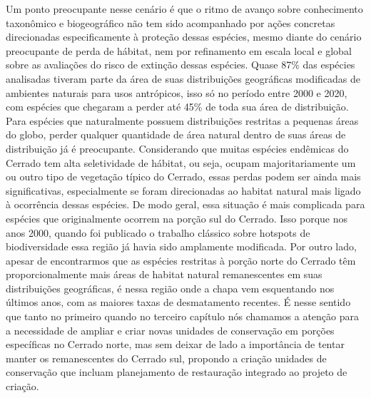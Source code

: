 \documentclass[12pt,openright,oneside,a4paper,english]{abntex2}
\begin{document}
Um ponto preocupante nesse cenário é que o ritmo de avanço sobre conhecimento taxonômico e biogeográfico não tem sido acompanhado por ações concretas direcionadas especificamente à proteção dessas espécies, mesmo diante do cenário preocupante de perda de hábitat, nem por refinamento em escala local e global sobre as avaliações do risco de extinção dessas espécies. Quase 87\% das espécies analisadas tiveram parte da área de suas distribuições geográficas modificadas de ambientes naturais para usos antrópicos, isso só no período entre 2000 e 2020, com espécies que chegaram a perder até 45\% de toda sua área de distribuição. Para espécies que naturalmente possuem distribuições restritas a pequenas áreas do globo, perder qualquer quantidade de área natural dentro de suas áreas de distribuição já é preocupante. Considerando que muitas espécies endêmicas do Cerrado tem alta seletividade de hábitat, ou seja, ocupam majoritariamente um ou outro tipo de vegetação típico do Cerrado, essas perdas podem ser ainda mais significativas, especialmente se foram direcionadas ao habitat natural mais ligado à ocorrência dessas espécies. De modo geral, essa situação é mais complicada para espécies que originalmente ocorrem na porção sul do Cerrado. Isso porque nos anos 2000, quando foi publicado o trabalho clássico sobre hotspots de biodiversidade \citep{Myers2000} essa região já havia sido amplamente modificada. Por outro lado, apesar de encontrarmos que as espécies restritas à porção norte do Cerrado têm proporcionalmente mais áreas de habitat natural remanescentes em suas distribuições geográficas, é nessa região onde a chapa vem esquentando nos últimos anos, com as maiores taxas de desmatamento recentes. É nesse sentido que tanto no primeiro quando no terceiro capítulo nós chamamos a atenção para a necessidade de ampliar e criar novas unidades de conservação em porções específicas no Cerrado norte, mas sem deixar de lado a importância de tentar manter os remanescentes do Cerrado sul, propondo a criação unidades de conservação que incluam planejamento de restauração integrado ao projeto de criação.
\end{document}

